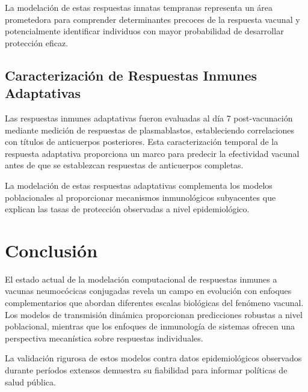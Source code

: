 La modelación de estas respuestas innatas tempranas representa un área prometedora para comprender determinantes precoces de la respuesta vacunal y potencialmente identificar individuos con mayor probabilidad de desarrollar protección eficaz.

\subsection{Caracterización de Respuestas Inmunes Adaptativas}

Las respuestas inmunes adaptativas fueron evaluadas al día 7 post-vacunación mediante medición de respuestas de plasmablastos, estableciendo correlaciones con títulos de anticuerpos posteriores. Esta caracterización temporal de la respuesta adaptativa proporciona un marco para predecir la efectividad vacunal antes de que se establezcan respuestas de anticuerpos completas.

La modelación de estas respuestas adaptativas complementa los modelos poblacionales al proporcionar mecanismos inmunológicos subyacentes que explican las tasas de protección observadas a nivel epidemiológico.




\section{Conclusión}

El estado actual de la modelación computacional de respuestas inmunes a vacunas neumocócicas conjugadas revela un campo en evolución con enfoques complementarios que abordan diferentes escalas biológicas del fenómeno vacunal. Los modelos de transmisión dinámica proporcionan predicciones robustas a nivel poblacional, mientras que los enfoques de inmunología de sistemas ofrecen una perspectiva mecanística sobre respuestas individuales.

La validación rigurosa de estos modelos contra datos epidemiológicos observados durante períodos extensos demuestra su fiabilidad para informar políticas de salud pública. 